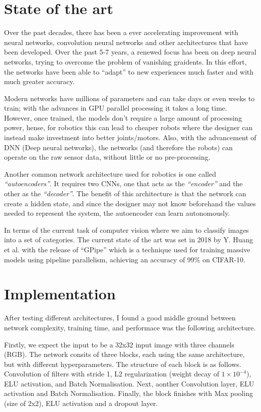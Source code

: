 \documentclass[12pt]{article}
\begin{document}
\section{State of the art}
\label{sec:soa}
Over the past decades, there has been a ever accelerating improvement with neural networks, convolution neural networks and other architectures that have been developed. Over the past 5-7 years, a renewed focus has been on deep neural networks, trying to overcome the problem of vanishing graidents. In this effort, the networks have been able to ``adapt'' to new experiences much faster and with much greater accuracy. \cite{imagenet, howard2019searching}

Modern networks have millions of parameters and can take days or even weeks to train; with the advances in GPU parallel processing it takes a long time. However, once trained, the models don't require a large amount of processing power, hense, for robotics this can lead to cheaper robots where the designer can instead make investment into better joints/motors. Also, with the advancement of DNN (Deep neural networks), the networks (and therefore the robots) can operate on the raw sensor data, without little or no pre-processing.

Another common network architecture used for robotics is one called \textit{``autoencoders''}. It requires two CNNs, one that acts as the \textit{``encoder''} and the other as the \textit{``decoder''}. The benefit of this architecture is that the network can create a hidden state, and since the designer may not know beforehand the values needed to represent the system, the autoencoder can learn autonomously.

In terms of the current task of computer vision where we aim to classify images into a set of categories. The current state of the art was set in 2018 by Y. Huang et al. with the release of ``GPipe'' which is a technique used for training massive models using pipeline parallelism, achieving an accuracy of 99\% on CIFAR-10.


\section{Implementation}
\label{sec:imple}
After testing different architectures, I found a good middle ground between network complexity, training time, and performace was the following architecture.

Firstly, we expect the input to be a 32x32 input image with three channels (RGB). The network consits of three blocks, each using the same architecture, but with different hyperparameters. The structure of each block is as follows. Convolution of filters with stride 1, L2 regularization (weight decay of $1\times 10^{-4}$), ELU activation, and Batch Normalisation. Next, aonther Convolution layer, ELU activation and Batch Normalisation. Finally, the block finishes with Max pooling (size of 2x2), ELU activation and a dropout layer.
\end{document}
